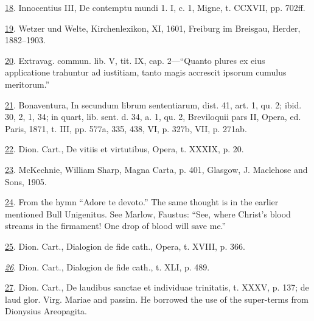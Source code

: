 \protect\hypertarget{23_NOTES.xhtmlux5cux23id_701}{\protect\hyperlink{17_Chapter_Ten__THE_FAILURE_OF_IMAG.xhtmlux5cux23id_700}{18}}.
Innocentius III, De contemptu mundi 1. I, c. 1, Migne, t. CCXVII, pp.
702ff.

\protect\hypertarget{23_NOTES.xhtmlux5cux23id_699}{\protect\hyperlink{17_Chapter_Ten__THE_FAILURE_OF_IMAG.xhtmlux5cux23id_698}{19}}.
Wetzer und Welte, Kirchenlexikon, XI, 1601, Freiburg im Breisgau,
Herder, 1882--1903.

\protect\hypertarget{23_NOTES.xhtmlux5cux23id_697}{\protect\hyperlink{17_Chapter_Ten__THE_FAILURE_OF_IMAG.xhtmlux5cux23id_696}{20}}.
Extravag. commun. lib. V, tit. IX, cap. 2---``Quanto plures ex eius
applicatione trahuntur ad iustitiam, tanto magis accrescit ipsorum
cumulus meritorum.''

\protect\hypertarget{23_NOTES.xhtmlux5cux23id_695}{\protect\hyperlink{17_Chapter_Ten__THE_FAILURE_OF_IMAG.xhtmlux5cux23id_694}{21}}.
Bonaventura, In secundum librum sententiarum, dist. 41, art. 1, qu. 2;
ibid. 30, 2, 1, 34; in quart, lib. sent. d. 34, a. 1, qu. 2, Breviloquii
pars II, Opera, ed. Paris, 1871, t. III, pp. 577a, 335, 438, VI, p.
327b, VII, p. 271ab.

\protect\hypertarget{23_NOTES.xhtmlux5cux23id_693}{\protect\hyperlink{17_Chapter_Ten__THE_FAILURE_OF_IMAG.xhtmlux5cux23id_692}{22}}.
Dion. Cart., De vitiis et virtutibus, Opera, t. XXXIX, p. 20.

\protect\hypertarget{23_NOTES.xhtmlux5cux23id_691}{\protect\hyperlink{17_Chapter_Ten__THE_FAILURE_OF_IMAG.xhtmlux5cux23id_690}{23}}.
McKechnie, William Sharp, Magna Carta, p. 401, Glasgow, J. Maclehose and
Sons, 1905.

\protect\hypertarget{23_NOTES.xhtmlux5cux23id_689}{\protect\hyperlink{17_Chapter_Ten__THE_FAILURE_OF_IMAG.xhtmlux5cux23id_688}{24}}.
From the hymn ``Adore te devoto.'' The same thought is in the earlier
mentioned Bull Unigenitus. See Marlow, Faustus: ``See, where Christ's
blood streams in the firmament! One drop of blood will save me.''

\protect\hypertarget{23_NOTES.xhtmlux5cux23id_687}{\protect\hyperlink{17_Chapter_Ten__THE_FAILURE_OF_IMAG.xhtmlux5cux23id_686}{25}}.
Dion. Cart., Dialogion de fide cath., Opera, t. XVIII, p. 366.

\emph{\protect\hypertarget{23_NOTES.xhtmlux5cux23id_685}{\protect\hyperlink{17_Chapter_Ten__THE_FAILURE_OF_IMAG.xhtmlux5cux23id_684}{26}}}.
Dion. Cart., Dialogion de fide cath., t. XLI, p. 489.

\protect\hypertarget{23_NOTES.xhtmlux5cux23id_683}{\protect\hyperlink{17_Chapter_Ten__THE_FAILURE_OF_IMAG.xhtmlux5cux23id_682}{27}}.
Dion. Cart., De laudibus sanctae et individuae trinitatis, t. XXXV, p.
137; de laud glor. Virg. Mariae and passim. He borrowed the use of the
super-terms from Dionysius Areopagita.

